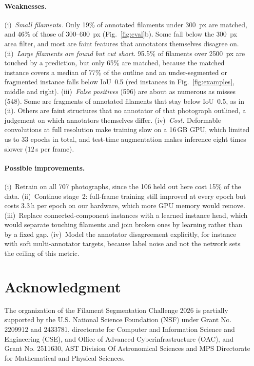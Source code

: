 \documentclass[sigconf]{acmart}
\begin{document}
\paragraph{Weaknesses.}
(i)~\emph{Small filaments.} Only 19\% of annotated filaments under 300~px are matched, and 46\% of those of 300--600~px (Fig.~\ref{fig:eval}b). Some fall below the 300~px area filter, and most are faint features that annotators themselves disagree on.
(ii)~\emph{Large filaments are found but cut short.} 95.5\% of filaments over 2500~px are touched by a prediction, but only 65\% are matched, because the matched instance covers a median of 77\% of the outline and an under-segmented or fragmented instance falls below IoU~0.5 (red instances in Fig.~\ref{fig:examples}, middle and right).
(iii)~\emph{False positives} (596) are about as numerous as misses (548). Some are fragments of annotated filaments that stay below IoU~0.5, as in (ii). Others are faint structures that no annotator of that photograph outlined, a judgement on which annotators themselves differ.
(iv)~\emph{Cost.} Deformable convolutions at full resolution make training slow on a 16\,GB GPU, which limited us to 33 epochs in total, and test-time augmentation makes inference eight times slower (12\,s per frame).

\paragraph{Possible improvements.}
(i)~Retrain on all 707 photographs, since the 106 held out here cost 15\% of the data. (ii)~Continue stage~2: full-frame training still improved at every epoch but costs 3.3\,h per epoch on our hardware, which more GPU memory would remove. (iii)~Replace connected-component instances with a learned instance head, which would separate touching filaments and join broken ones by learning rather than by a fixed gap. (iv)~Model the annotator disagreement explicitly, for instance with soft multi-annotator targets, because label noise and not the network sets the ceiling of this metric.


\section{Acknowledgment}\label{sec:acknowledgment}
    The organization of the Filament Segmentation Challenge 2026 is partially supported by the U.S. National Science Foundation (NSF) under Grant No. 2209912 and 2433781, directorate for Computer and Information Science and Engineering (CSE), and Office of Advanced Cyberinfrastructure (OAC), and Grant No. 2511630, AST Division Of Astronomical Sciences and MPS Directorate for Mathematical and Physical Sciences.
\end{document}

